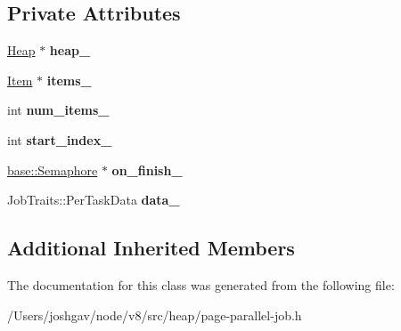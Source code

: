 \subsection*{Private Attributes}
\begin{DoxyCompactItemize}
\item 
\hyperlink{classv8_1_1internal_1_1_heap}{Heap} $\ast$ {\bfseries heap\+\_\+}\hypertarget{classv8_1_1internal_1_1_page_parallel_job_1_1_task_aa7d6b553d42fcc981dafd20ae33a240a}{}\label{classv8_1_1internal_1_1_page_parallel_job_1_1_task_aa7d6b553d42fcc981dafd20ae33a240a}

\item 
\hyperlink{structv8_1_1internal_1_1_page_parallel_job_1_1_item}{Item} $\ast$ {\bfseries items\+\_\+}\hypertarget{classv8_1_1internal_1_1_page_parallel_job_1_1_task_ab4a6013d644470915646c3dba112ce72}{}\label{classv8_1_1internal_1_1_page_parallel_job_1_1_task_ab4a6013d644470915646c3dba112ce72}

\item 
int {\bfseries num\+\_\+items\+\_\+}\hypertarget{classv8_1_1internal_1_1_page_parallel_job_1_1_task_a4c1a03faa35d18c964e125cb84d2106c}{}\label{classv8_1_1internal_1_1_page_parallel_job_1_1_task_a4c1a03faa35d18c964e125cb84d2106c}

\item 
int {\bfseries start\+\_\+index\+\_\+}\hypertarget{classv8_1_1internal_1_1_page_parallel_job_1_1_task_acacdf65688125ed892597918e3527a48}{}\label{classv8_1_1internal_1_1_page_parallel_job_1_1_task_acacdf65688125ed892597918e3527a48}

\item 
\hyperlink{classv8_1_1base_1_1_semaphore}{base\+::\+Semaphore} $\ast$ {\bfseries on\+\_\+finish\+\_\+}\hypertarget{classv8_1_1internal_1_1_page_parallel_job_1_1_task_a95b511b58f566609a56618641d61aab3}{}\label{classv8_1_1internal_1_1_page_parallel_job_1_1_task_a95b511b58f566609a56618641d61aab3}

\item 
Job\+Traits\+::\+Per\+Task\+Data {\bfseries data\+\_\+}\hypertarget{classv8_1_1internal_1_1_page_parallel_job_1_1_task_aefa8b7138818a2eb2ff94c2f6fd97b5c}{}\label{classv8_1_1internal_1_1_page_parallel_job_1_1_task_aefa8b7138818a2eb2ff94c2f6fd97b5c}

\end{DoxyCompactItemize}
\subsection*{Additional Inherited Members}


The documentation for this class was generated from the following file\+:\begin{DoxyCompactItemize}
\item 
/\+Users/joshgav/node/v8/src/heap/page-\/parallel-\/job.\+h\end{DoxyCompactItemize}
